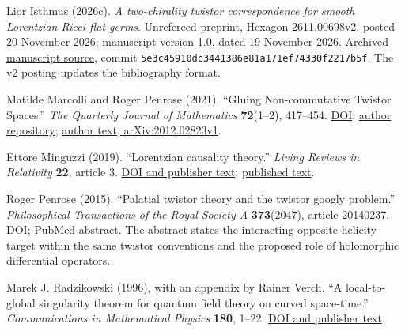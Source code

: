 \documentclass[
  english,
  11pt,
  reqno]{amsart}
\begin{document}
\begin{thebibliography}{}
\leavevmode{}\label{ref-IsthmusSmooth2026}%
Lior Isthmus (2026c). \emph{A two-chirality twistor correspondence for
smooth Lorentzian Ricci-flat germs}. Unrefereed preprint,
\href{https://hexagonmath.org/2611.00698v2}{Hexagon 2611.00698v2},
posted 20 November 2026;
\href{https://doi.org/10.5281/zenodo.24385872}{manuscript version 1.0},
dated 19 November 2026.
\href{https://github.com/lioristhmus/smooth-twistor-germs/blob/5e3c45910dc3441386e81a171ef74330f2217b5f/paper/smooth-twistor-germs-en-v1.0.md}{Archived
manuscript source}, commit
\texttt{5e3c45910dc3441386e81a171ef74330f2217b5f}. The v2 posting
updates the bibliography format.

\leavevmode{}\label{ref-MarcolliPenrose2021}%
Matilde Marcolli and Roger Penrose (2021). ``Gluing Non-commutative
Twistor Spaces.'' \emph{The Quarterly Journal of Mathematics}
\textbf{72}(1--2), 417--454.
\href{https://doi.org/10.1093/qmath/haab024}{DOI};
\href{https://authors.library.caltech.edu/records/a1a3t-zxy51}{author
repository}; \href{https://arxiv.org/abs/2012.02823v1}{author text,
arXiv:2012.02823v1}.

\leavevmode{}\label{ref-Minguzzi2019}%
Ettore Minguzzi (2019). ``Lorentzian causality theory.'' \emph{Living
Reviews in Relativity} \textbf{22}, article 3.
\href{https://doi.org/10.1007/s41114-019-0019-x}{DOI and publisher
text};
\href{https://s3.cern.ch/inspire-prod-files-7/7a575d682fd15aaad8463a778fac1609}{published
text}.

\leavevmode{}\label{ref-Penrose2015}%
Roger Penrose (2015). ``Palatial twistor theory and the twistor googly
problem.'' \emph{Philosophical Transactions of the Royal Society A}
\textbf{373}(2047), article 20140237.
\href{https://doi.org/10.1098/rsta.2014.0237}{DOI};
\href{https://pubmed.ncbi.nlm.nih.gov/26124255/}{PubMed abstract}. The
abstract states the interacting opposite-helicity target within the same
twistor conventions and the proposed role of holomorphic differential
operators.

\leavevmode{}\label{ref-RadzikowskiVerch1996}%
Marek J. Radzikowski (1996), with an appendix by Rainer Verch. ``A
local-to-global singularity theorem for quantum field theory on curved
space-time.'' \emph{Communications in Mathematical Physics}
\textbf{180}, 1--22. \href{https://doi.org/10.1007/BF02101180}{DOI and
publisher text}.


\end{thebibliography}
\end{document}
